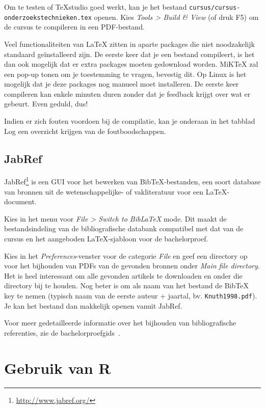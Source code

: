 Om te testen of TeXstudio goed werkt, kan je het bestand \texttt{cursus/cursus-onderzoekstechnieken.tex} openen. Kies \emph{Tools > Build \& View} (of druk F5) om de cursus te compileren in een PDF-bestand.

Veel functionaliteiten van \LaTeX{} zitten in aparte packages die niet noodzakelijk standaard geïnstalleerd zijn. De eerste keer dat je een bestand compileert, is het dan ook mogelijk dat er extra packages moeten gedownload worden. MiK\TeX{} zal een pop-up tonen om je toestemming te vragen, bevestig dit. Op Linux is het mogelijk dat je deze packages nog manueel moet installeren. De eerste keer compileren kan enkele minuten duren zonder dat je feedback krijgt over wat er gebeurt. Even geduld, dus!

Indien er zich fouten voordoen bij de compilatie, kan je onderaan in het tabblad Log een overzicht krijgen van de foutboodschappen.

\subsection{JabRef}

JabRef\footnote{\url{http://www.jabref.org/}} is een GUI voor het bewerken van Bib\TeX{}-bestanden, een soort database van bronnen uit de wetenschappelijke- of vakliteratuur voor een \LaTeX{}-document.

Kies in het menu voor \emph{File > Switch to BibLaTeX} mode. Dit maakt de bestandsindeling van de bibliografische databank compatibel met dat van de cursus en het aangeboden \LaTeX{}-sjabloon voor de bachelorproef.

Kies in het \emph{Preferences}-venster voor de categorie \emph{File} en geef een directory op voor het bijhouden van PDFs van de gevonden bronnen onder \emph{Main file directory}. Het is heel interessant om alle gevonden artikels te downloaden en onder die directory bij te houden. Nog beter is om als naam van het bestand de Bib\TeX{} key te nemen (typisch naam van de eerste auteur + jaartal, bv. \texttt{Knuth1998.pdf}). Je kan het bestand dan makkelijk openen vanuit JabRef.

Voor meer gedetailleerde informatie over het bijhouden van bibliografische referenties, zie de bachelorproefgids~\autocite{VanVreckem2017}.


\section{Gebruik van R}

